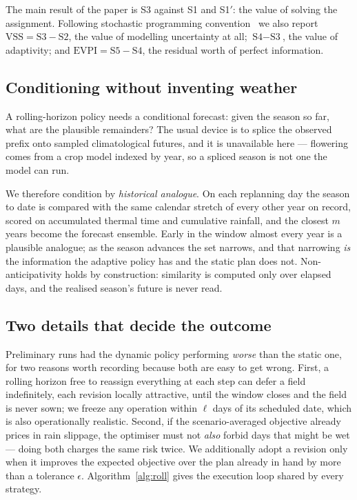 \documentclass[10pt,twocolumn]{article}
\newcommand{\EVPI}{\mathrm{EVPI}}
\newcommand{\VSS}{\mathrm{VSS}}
\begin{document}
The main result of the paper is S3 against S1 and S1$'$: the value of
solving the assignment. Following stochastic programming
convention~\cite{birge} we also report $\VSS = \text{S3} - \text{S2}$, the
value of modelling uncertainty at all; $\text{S4} - \text{S3}$, the value of
adaptivity; and $\EVPI = \text{S5} - \text{S4}$, the residual worth of
perfect information.

\subsection{Conditioning without inventing weather}

A rolling-horizon policy needs a conditional forecast: given the season so
far, what are the plausible remainders? The usual device is to splice the
observed prefix onto sampled climatological futures, and it is unavailable
here --- flowering comes from a crop model indexed by year, so a spliced
season is not one the model can run.

We therefore condition by \emph{historical analogue}. On each replanning day
the season to date is compared with the same calendar stretch of every other
year on record, scored on accumulated thermal time and cumulative rainfall,
and the closest $m$ years become the forecast ensemble. Early in the window
almost every year is a plausible analogue; as the season advances the set
narrows, and that narrowing \emph{is} the information the adaptive policy
has and the static plan does not. Non-anticipativity holds by construction:
similarity is computed only over elapsed days, and the realised season's
future is never read.

\subsection{Two details that decide the outcome}

Preliminary runs had the dynamic policy performing \emph{worse} than the
static one, for two reasons worth recording because both are easy to get
wrong. First, a rolling horizon free to reassign everything at each step can
defer a field indefinitely, each revision locally attractive, until the
window closes and the field is never sown; we freeze any operation within
$\ell$ days of its scheduled date, which is also operationally realistic.
Second, if the scenario-averaged objective already prices in rain slippage,
the optimiser must not \emph{also} forbid days that might be wet --- doing
both charges the same risk twice. We additionally adopt a revision only when
it improves the expected objective over the plan already in hand by more
than a tolerance $\epsilon$. Algorithm~\ref{alg:roll} gives the execution
loop shared by every strategy.
\end{document}

